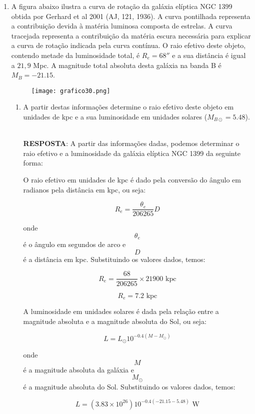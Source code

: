 \documentclass[a4paper,12pt]{article}
\begin{document}
\begin{enumerate}
\begin{enumerate}
\noindent\hrulefill

\end{enumerate}

\item A figura abaixo ilustra a curva de rotação da galáxia elíptica NGC 1399 
obtida por Gerhard et al 2001 (AJ, 121, 1936). A curva pontilhada 
representa a contribuição devida à matéria luminosa composta de estrelas. 
A curva tracejada representa a contribuição da matéria escura necessária 
para explicar a curva de rotação indicada pela curva contínua. O raio 
efetivo deste objeto, contendo metade da luminosidade total, é $R_e = 68''$ e a 
sua distância é igual a $21,9$ Mpc. A magnitude total absoluta desta galáxia 
na banda B é $M_B = -21.15$.

\begin{figure}[H]
\centering
\texttt{[image: grafico30.png]}
\end{figure}

\begin{enumerate}
\item A partir destas informações determine o raio efetivo deste objeto em 
unidades de kpc e a sua luminosidade em unidades solares ($M_{B \odot} = 5.48$).

\noindent\hrulefill\\\textbf{RESPOSTA}: A partir das informações dadas, podemos determinar o raio efetivo e a luminosidade da galáxia elíptica NGC 1399 da seguinte forma:

O raio efetivo em unidades de kpc é dado pela conversão do ângulo em radianos pela distância em kpc, ou seja:

$$R_e = \frac{\theta_e}{206265} D$$

onde $$\theta_e$$ é o ângulo em segundos de arco e $$D$$ é a distância em kpc. Substituindo os valores dados, temos:

$$R_e = \frac{68}{206265} \times 21900 \text{ kpc}$$

$$R_e = 7.2 \text{ kpc}$$

A luminosidade em unidades solares é dada pela relação entre a magnitude absoluta e a magnitude absoluta do Sol, ou seja:

$$L = L_{\odot} 10^{-0.4(M-M_{\odot})}$$

onde $$M$$ é a magnitude absoluta da galáxia e $$M_{\odot}$$ é a magnitude absoluta do Sol. Substituindo os valores dados, temos:

$$L = (3.83\times 10^{26}) 10^{-0.4(-21.15-5.48)} \text{ W}$$


\end{enumerate}
\end{enumerate}
\end{document}
